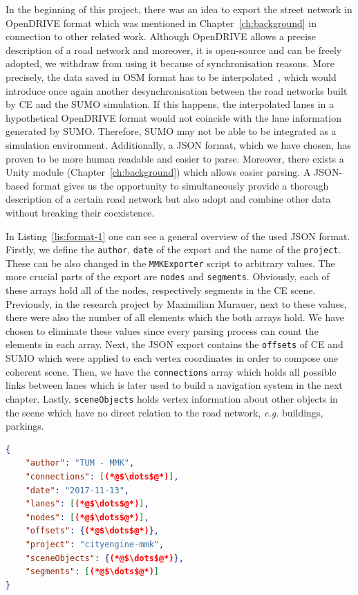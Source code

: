 In the beginning of this project, there was an idea to export the street network in OpenDRIVE format which was mentioned in Chapter~\ref{ch:background} in connection to other related work. Although OpenDRIVE allows a precise description of a road network and moreover, it is open-source and can be freely adopted, we withdraw from using it because of synchronisation reasons. More precisely, the data saved in OSM format has to be interpolated~\cite{shi2011automatic}, which would introduce once again another desynchronisation between the road networks built by CE and the SUMO simulation. If this happens, the interpolated lanes in a hypothetical OpenDRIVE format would not coincide with the lane information generated by SUMO. Therefore, SUMO may not be able to be integrated as a simulation environment. Additionally, a JSON format, which we have chosen, has proven to be more human readable and easier to parse. Moreover, there exists a Unity module (Chapter~\ref{ch:background}) which allows easier parsing. A JSON-based format gives us the opportunity to simultaneously provide a thorough description of a certain road network but also adopt and combine other data without breaking their coexistence. 

In Listing~\ref{lis:format-1} one can see a general overview of the used JSON format. Firstly, we define the \texttt{author}, \texttt{date} of the export and the name of the \texttt{project}. These can be also changed in the \texttt{MMKExporter} script to arbitrary values. The more crucial parts of the export are \texttt{nodes} and \texttt{segments}. Obviously, each of these arrays hold all of the nodes, respectively segments in the CE scene. Previously, in the research project by Maximilian Murauer, next to these values, there were also the number of all elements which the both arrays hold. We have chosen to eliminate these values since every parsing process can count the elements in each array. Next, the JSON export contains the \texttt{offsets} of CE and SUMO which were applied to each vertex coordinates in order to compose one coherent scene. Then, we have the \texttt{connections} array which holds all possible links between lanes which is later used to build a navigation system in the next chapter. Lastly, \texttt{sceneObjects} holds vertex information about other objects in the scene which have no direct relation to the road network, \emph{e.g.} buildings, parkings.\\

    \begin{scriptsize}
	   \begin{lstlisting}[language=json,firstnumber=1,caption={General overview of the used JSON format for description of road networks.},label={lis:format-1}]
{
    "author": "TUM - MMK",
    "connections": [(*@$\dots$@*)],
    "date": "2017-11-13",
    "lanes": [(*@$\dots$@*)],
    "nodes": [(*@$\dots$@*)],
    "offsets": {(*@$\dots$@*)},
    "project": "cityengine-mmk",
    "sceneObjects": {(*@$\dots$@*)},
    "segments": [(*@$\dots$@*)]
}
	   \end{lstlisting}
    \end{scriptsize}

